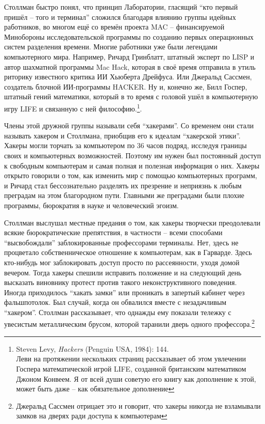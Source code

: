 Столлман быстро понял, что принцип Лаборатории, гласящий \enquote{кто первый пришёл -- того и терминал} сложился благодаря влиянию группы идейных работников, во многом ещё со времён проекта MAC -- финансируемой Минобороны исследовательской программы по созданию первых операционных систем разделения времени. Многие работники уже были легендами компьютерного мира. Например, Ричард Гринблатт, штатный эксперт по LISP и автор шахматной программы Mac Hack, которая в своё время отправила в утиль риторику известного критика ИИ Хьюберта Дрейфуса. Или Джеральд Сассмен, создатель блочной ИИ-программы HACKER. Ну и, конечно же, Билл Госпер, штатный гений математики, который в то время с головой ушёл в компьютерную игру LIFE и связанную с ней философию.\footnote{Steven Levy, \textit{Hackers} (Penguin USA, 1984): 144.\\Леви на протяжении нескольких страниц рассказывает об этом увлечении Госпера математической игрой LIFE, созданной британским математиком Джоном Конвеем. Я от всей души советую его книгу как дополнение к этой, может быть даже -- как обязательное дополнение}.

Члены этой дружной группы называли себя \enquote{хакерами}. Со временем они стали называть хакером и Столлмана, приобщив его к идеалам \enquote{хакерской этики}. Хакеры могли торчать за компьютером по 36 часов подряд, исследуя границы своих и компьютерных возможностей. Поэтому им нужен был постоянный доступ к свободным компьютерам и самая полная и полезная информация о них. Хакеры открыто говорили о том, как изменить мир с помощью компьютерных программ, и Ричард стал бессознательно разделять их презрение и неприязнь к любым преградам на этом благородном пути. Главными же преградами были плохие программы, бюрократия в науке и человеческий эгоизм.

Столлман выслушал местные предания о том, как хакеры творчески преодолевали всякие бюрократические препятствия, в частности -- всеми способами \enquote{высвобождали} заблокированные профессорами терминалы. Нет, здесь не процветало собственническое отношение к компьютерам, как в Гарварде. Здесь кто-нибудь мог заблокировать доступ просто по рассеянности, уходя домой вечером. Тогда хакеры спешили исправить положение и на следующий день высказать виновнику протест против такого неконструктивного поведения. Иногда приходилось \enquote{хакать замки} или проникать в запертый кабинет через фальшпотолок. Был случай, когда он обвалился вместе с незадачливым \enquote{хакером}. Столлман рассказывает, что однажды ему показали тележку с увесистым металлическим брусом, которой таранили дверь одного профессора.\footnote{Джеральд Сассмен отрицает это и говорит, что хакеры никогда не взламывали замков на дверях ради доступа к компьютерам}

